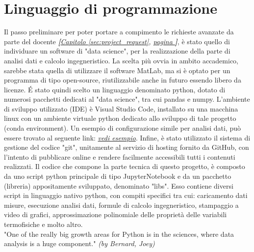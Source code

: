 \documentclass[a4paper,10pt]{article}                                                                                       %
\begin{document}
\section{Linguaggio di programmazione}                                                                                      %
\label{sec:progr_lang}                                                                                                      %
  Il passo preliminare per poter portare a compimento le richieste avanzate da parte del docente
  \textit{\textbf{[}\hyperref[sec:project_request]{Capitolo }\ref{sec:project_request},
  \hyperref[sec:project_request]{pagina }\pageref{sec:project_request}\textbf{]}}, è stato quello di
  individuare un software di "data science", per la realizzazione della parte di analisi dati e calcolo ingegneristico.
  La scelta più ovvia in ambito accademico, sarebbe stata quella di utilizzare il software MatLab, ma si è optato per un
  programma di tipo open-source, riutilizzabile anche in futuro essendo libero da licenze. É stato quindi scelto un
  linguaggio denominato python, dotato di numerosi pacchetti dedicati al "data science", tra cui pandas e numpy.
  L'ambiente di sviluppo utilizzato (IDE) è Visual Studio Code, installato su una macchina linux con un ambiente virtuale
  python dedicato allo sviluppo di tale progetto (conda environment). Un esempio di configurazione simile per analisi
  dati, può essere trovato al seguente link:
  \textit{\href{https://code.visualstudio.com/docs/datascience/data-science-tutorial}{vedi esempio}}. Infine, è stato
  utilizzato il sistema di gestione del codice "git", unitamente al servizio di hosting fornito da GitHub, con l'intento
  di pubblicare online e rendere facilmente accessibili tutti i contenuti realizzati. Il codice che compone la parte
  tecnica di questo progetto, è composto da uno script python principale di tipo JupyterNotebook e da un pacchetto
  (libreria) appositamente sviluppato, denominato "libs". Esso contiene diversi script in linguaggio nativo python, con
  compiti specifici tra cui: caricamento dati misure, esecuzione analisi dati, formule di calcolo ingegneristico,
  stampaggio a video di grafici, approssimazione polinomiale delle proprietà delle variabili termofisiche e molto
  altro.\vspace{2mm}\\
  "One of the really big growth areas for Python is in the sciences, where data analysis is a huge component."
  \textit{(by Bernard, Joey)}
  \cite{Bernard2016}
\end{document}
